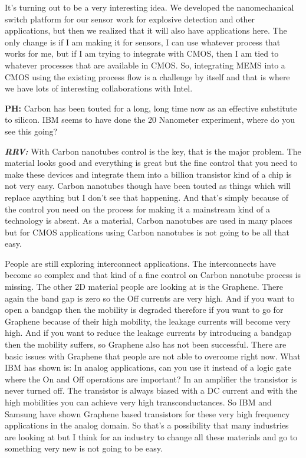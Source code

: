 \begin{multicols}{2}
It’s turning out to be a very interesting idea. We developed the nanomechanical switch platform for our sensor work for explosive detection and other applications, but then we realized that it will also have applications here. The only change is if I am making it for sensors, I can use whatever process that works for me, but if I am trying to integrate with CMOS, then I am tied to whatever processes that are available in CMOS. So, integrating MEMS into a CMOS using the existing process flow is a challenge by itself and that is where we have lots of interesting collaborations with Intel.

\textbf{PH:} Carbon has been touted for a long, long time now as an effective substitute to silicon. IBM seems to have done the 20 Nanometer experiment, where do you see this going?

\textbf{\textit{RRV:}} With Carbon nanotubes control is the key, that is the major problem. The material looks good and everything is great but the fine control that you need to make these devices and integrate them into a billion transistor kind of a chip is not very easy. Carbon nanotubes though have been touted as things which will replace anything but I don’t see that happening. And that’s simply because of the control you need on the process for making it a mainstream kind of a technology is absent. As a material, Carbon nanotubes are used in many places but for CMOS applications using Carbon nanotubes is not going to be all that easy.

People are still exploring interconnect applications. The interconnects have become so complex and that kind of a fine control on Carbon nanotube process is missing. The other 2D material people are looking at is the Graphene. There again the band gap is zero so the Off currents are very high. And if you want to open a bandgap then the mobility is degraded therefore if you want to go for Graphene because of their high mobility, the leakage currents will become very high. And if you want to reduce the leakage currents by introducing a bandgap then the mobility suffers, so Graphene also has not been successful. There are basic issues with Graphene that people are not able to overcome right now. What IBM has shown is: In analog applications, can you use it instead of a logic gate where the On and Off operations are important? In an amplifier the transistor is never turned off. The transistor is always biased with a DC current and with the high mobilities you can achieve very high transconductances. So IBM and Samsung have shown Graphene based transistors for these very high frequency applications in the analog domain. So that’s a possibility that many industries are looking at but I think for an industry to change all these materials and go to something very new is not going to be easy. 


\end{multicols}
